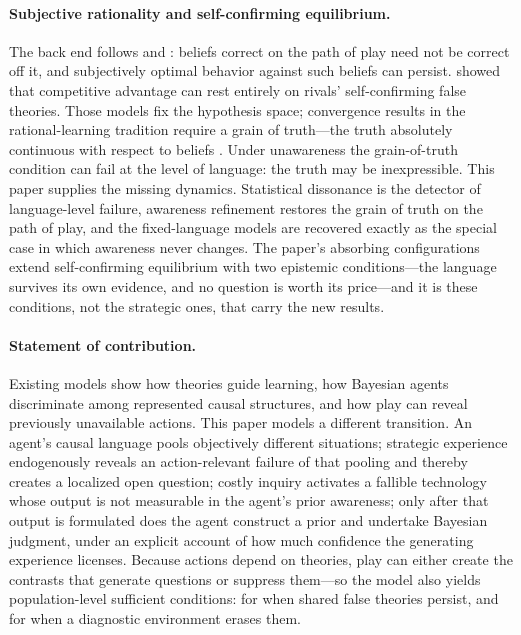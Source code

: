 \documentclass[11pt]{article}
\theoremstyle{definition}
\begin{document}
\paragraph{Subjective rationality and self-confirming equilibrium.}
The back end follows \citet{KalaiLehrer1993b} and \citet{FudenbergLevine1993}:
beliefs correct on the path of play need not be correct off it, and
subjectively optimal behavior against such beliefs can persist.
\citet{Ryall2003} showed that competitive advantage can rest entirely on
rivals' self-confirming false theories.  Those models fix the hypothesis
space; convergence results in the rational-learning tradition require a grain
of truth---the truth absolutely continuous with respect to beliefs
\citep{KalaiLehrer1993a}.  Under unawareness the grain-of-truth condition can
fail at the level of language: the truth may be inexpressible.  This paper
supplies the missing dynamics.  Statistical dissonance is the detector of
language-level failure, awareness refinement restores the grain of truth on
the path of play, and the fixed-language models are recovered exactly as the
special case in which awareness never changes.  The paper's absorbing
configurations extend self-confirming equilibrium with two epistemic
conditions---the language survives its own evidence, and no question is worth
its price---and it is these conditions, not the strategic ones, that carry
the new results.

\paragraph{Statement of contribution.}
Existing models show how theories guide learning, how Bayesian agents
discriminate among represented causal structures, and how play can reveal
previously unavailable actions.  This paper models a different transition.
An agent's causal language pools objectively different situations;
strategic experience endogenously reveals an action-relevant failure of that
pooling and thereby creates a localized open question; costly inquiry
activates a fallible technology whose output is not measurable in the agent's
prior awareness; only after that output is formulated does the agent
construct a prior and undertake Bayesian judgment, under an explicit account
of how much confidence the generating experience licenses.  Because actions
depend on theories, play can either create the contrasts that generate
questions or suppress them---so the model also yields population-level
sufficient conditions: for when shared false theories persist, and for when a
diagnostic environment erases them.
\end{document}
